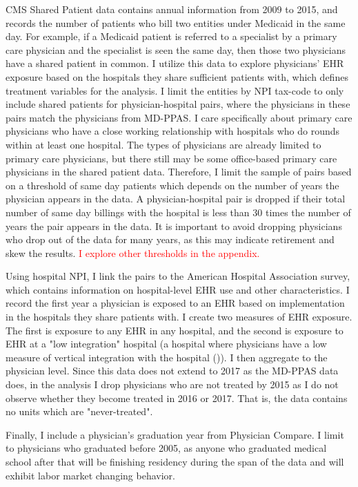 \documentclass[11pt]{article}
\begin{document}
CMS Shared Patient data contains annual information from 2009 to 2015, and records the number of patients who bill two entities under Medicaid in the same day. For example, if a Medicaid patient is referred to a specialist by a primary care physician and the specialist is seen the same day, then those two physicians have a shared patient in common. I utilize this data to explore physicians' EHR exposure based on the hospitals they share sufficient patients with, which defines treatment variables for the analysis. I limit the entities by NPI tax-code to only include shared patients for physician-hospital pairs, where the physicians in these pairs match the physicians from MD-PPAS. I care specifically about primary care physicians who have a close working relationship with hospitals who do rounds within at least one hospital. The types of physicians are already limited to primary care physicians, but there still may be some office-based primary care physicians in the shared patient data. Therefore, I limit the sample of pairs based on a threshold of same day patients which depends on the number of years the physician appears in the data. A physician-hospital pair is dropped if their total number of same day billings with the hospital is less than 30 times the number of years the pair appears in the data. It is important to avoid dropping physicians who drop out of the data for many years, as this may indicate retirement and skew the results. \textcolor{red}{I explore other thresholds in the appendix.} 

Using hospital NPI, I link the pairs to the American Hospital Association survey, which contains information on hospital-level EHR use and other characteristics. I record the first year a physician is exposed to an EHR based on implementation in the hospitals they share patients with. I create two measures of EHR exposure. The first is exposure to any EHR in any hospital, and the second is exposure to EHR at a "low integration" hospital (a hospital where physicians have a low measure of vertical integration with the hospital (\cite{madison2004hospital})). I then aggregate to the physician level. Since this data does not extend to 2017 as the MD-PPAS data does, in the analysis I drop physicians who are not treated by 2015 as I do not observe whether they become treated in 2016 or 2017. That is, the data contains no units which are "never-treated".

Finally, I include a physician's graduation year from Physician Compare. I limit to physicians who graduated before 2005, as anyone who graduated medical school after that will be finishing residency during the span of the data and will exhibit labor market changing behavior. 
\end{document}
